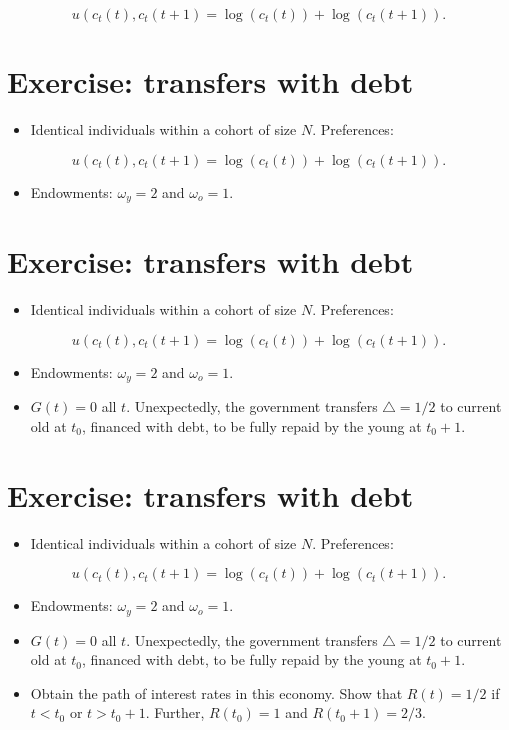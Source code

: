 \documentclass[10pt]{article}
\begin{document}
$$
u\left(c_{t}(t), c_{t}(t+1)=\log \left(c_{t}(t)\right)+\log \left(c_{t}(t+1)\right) .\right.
$$

\section*{Exercise: transfers with debt}
\begin{itemize}
  \item Identical individuals within a cohort of size $N$. Preferences:
\end{itemize}

$$
u\left(c_{t}(t), c_{t}(t+1)=\log \left(c_{t}(t)\right)+\log \left(c_{t}(t+1)\right) .\right.
$$

\begin{itemize}
  \item Endowments: $\omega_{y}=2$ and $\omega_{o}=1$.
\end{itemize}

\section*{Exercise: transfers with debt}
\begin{itemize}
  \item Identical individuals within a cohort of size $N$. Preferences:
\end{itemize}

$$
u\left(c_{t}(t), c_{t}(t+1)=\log \left(c_{t}(t)\right)+\log \left(c_{t}(t+1)\right) .\right.
$$

\begin{itemize}
  \item Endowments: $\omega_{y}=2$ and $\omega_{o}=1$.
  \item $G(t)=0$ all $t$. Unexpectedly, the government transfers $\triangle=1 / 2$ to current old at $t_{0}$, financed with debt, to be fully repaid by the young at $t_{0}+1$.
\end{itemize}

\section*{Exercise: transfers with debt}
\begin{itemize}
  \item Identical individuals within a cohort of size $N$. Preferences:
\end{itemize}

$$
u\left(c_{t}(t), c_{t}(t+1)=\log \left(c_{t}(t)\right)+\log \left(c_{t}(t+1)\right) .\right.
$$

\begin{itemize}
  \item Endowments: $\omega_{y}=2$ and $\omega_{o}=1$.
  \item $G(t)=0$ all $t$. Unexpectedly, the government transfers $\triangle=1 / 2$ to current old at $t_{0}$, financed with debt, to be fully repaid by the young at $t_{0}+1$.
  \item Obtain the path of interest rates in this economy. Show that $R(t)=1 / 2$ if $t<t_{0}$ or $t>t_{0}+1$. Further, $R\left(t_{0}\right)=1$ and $R\left(t_{0}+1\right)=2 / 3$.
\end{itemize}
\end{document}
